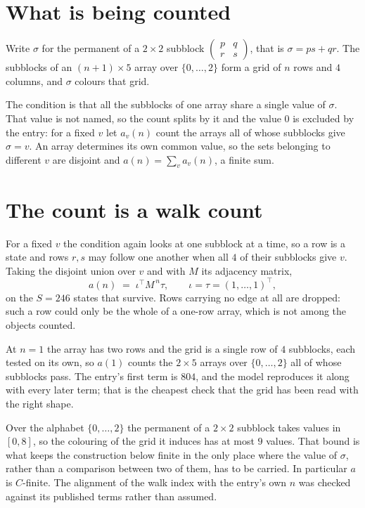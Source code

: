 \documentclass[11pt,a4paper]{article}
\theoremstyle{plain}
\theoremstyle{definition}
\begin{document}
\section{What is being counted}

Write $\sigma$ for the permanent of a $2\times2$ subblock
$\begin{pmatrix}p&q\\r&s\end{pmatrix}$, that is $\sigma=ps+qr$. The subblocks of an
$(n+1)\times5$ array over $\{0,\dots,2\}$ form a grid of $n$ rows and $4$
columns, and $\sigma$ colours that grid.

The condition is that all the subblocks of one array share a single value of $\sigma$. That
value is not named, so the count splits by it and the value $0$ is excluded by the entry: for a fixed $v$ let $a_v(n)$ count the
arrays all of whose subblocks give $\sigma=v$. An array determines its own common value, so
the sets belonging to different $v$ are disjoint and $a(n)=\sum_v a_v(n)$, a finite sum.

\section{The count is a walk count}

For a fixed $v$ the condition again looks at one subblock at a time, so a
row is a state and rows $r,s$ may follow one another when all $4$ of their subblocks give
$v$. Taking the disjoint union over $v$ and with $M$ its adjacency matrix,
\[
a(n)\;=\;\iota^{\!\top}M^{\,n}\tau,\qquad\iota=\tau=(1,\dots,1)^{\!\top},
\]
on the $S=246$ states that survive. Rows carrying no edge at all are dropped: such a row could
only be the whole of a one-row array, which is not among the objects counted.

At $n=1$ the array has two rows and the grid is a single row of $4$
subblocks, each tested on its own, so $a(1)$ counts the
$2\times5$ arrays over $\{0,\dots,2\}$ all of whose subblocks pass. The entry's
first term is $804$, and the model reproduces it along with every later term; that is the
cheapest check that the grid has been read with the right shape.

Over the alphabet $\{0,\dots,2\}$ the permanent of a $2\times2$ subblock takes values in
$[0,8]$, so the colouring of the grid it induces has at most $9$ values.
That bound is what keeps the construction below finite in the only place where the value of
$\sigma$, rather than a comparison between two of them, has to be carried.
In particular $a$ is $C$-finite. The alignment of the walk index with the entry's own $n$ was
checked against its published terms rather than assumed.
\end{document}
